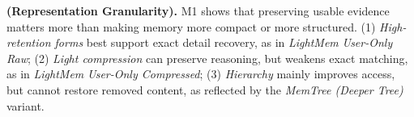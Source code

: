 \documentclass{llmxive}
\providecommand{\bfit}[1]{\textbf{\textit{#1}}}
\begin{document}
\begin{findingbox}
\textbf{(Representation Granularity).}
M1 shows that preserving usable evidence matters more than making memory more compact or more structured.
(1) \emph{High-retention forms} best support exact detail recovery, as in \textit{LightMem} \textit{User-Only Raw}; (2) \emph{Light compression} can preserve reasoning, but weakens exact matching, as in \textit{LightMem} \textit{User-Only Compressed}; (3) \emph{Hierarchy} mainly improves access, but cannot restore removed content, as reflected by the \textit{MemTree (Deeper Tree)} variant.
\end{findingbox}



\end{document}
